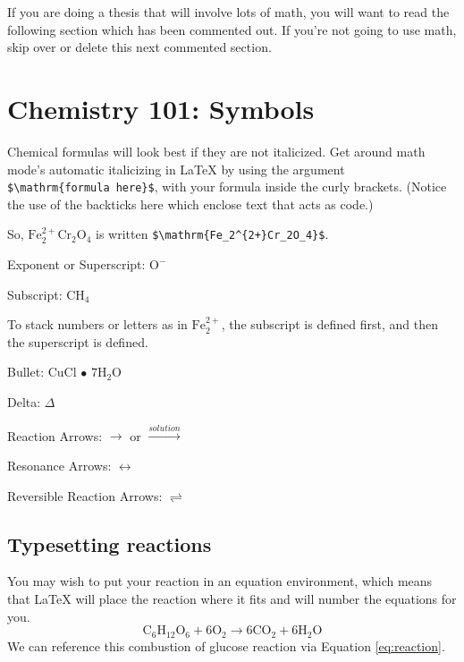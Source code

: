\documentclass[12pt,twoside]{reedthesis}
\begin{document}
If you are doing a thesis that will involve lots of math, you will want to read the following section which has been commented out. If you're not going to use math, skip over or delete this next commented section.

\hypertarget{chemistry-101-symbols}{%
\section{Chemistry 101: Symbols}\label{chemistry-101-symbols}}

Chemical formulas will look best if they are not italicized. Get around math mode's automatic italicizing in LaTeX by using the argument \texttt{\$\textbackslash{}mathrm\{formula\ here\}\$}, with your formula inside the curly brackets. (Notice the use of the backticks here which enclose text that acts as code.)

So, \(\mathrm{Fe_2^{2+}Cr_2O_4}\) is written \texttt{\$\textbackslash{}mathrm\{Fe\_2\^{}\{2+\}Cr\_2O\_4\}\$}.

\noindent Exponent or Superscript: \(\mathrm{O^-}\)

\noindent Subscript: \(\mathrm{CH_4}\)

To stack numbers or letters as in \(\mathrm{Fe_2^{2+}}\), the subscript is defined first, and then the superscript is defined.

\noindent Bullet: CuCl \(\bullet\) \(\mathrm{7H_{2}O}\)

\noindent Delta: \(\Delta\)

\noindent Reaction Arrows: \(\longrightarrow\) or \(\xrightarrow{solution}\)

\noindent Resonance Arrows: \(\leftrightarrow\)

\noindent Reversible Reaction Arrows: \(\rightleftharpoons\)

\hypertarget{typesetting-reactions}{%
\subsection{Typesetting reactions}\label{typesetting-reactions}}

You may wish to put your reaction in an equation environment, which means that LaTeX will place the reaction where it fits and will number the equations for you.
\begin{equation}
  \mathrm{C_6H_{12}O_6  + 6O_2} \longrightarrow \mathrm{6CO_2 + 6H_2O}
  \label{eq:reaction}
\end{equation}
We can reference this combustion of glucose reaction via Equation \eqref{eq:reaction}.
\end{document}
